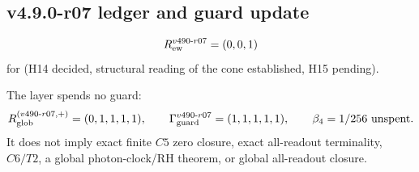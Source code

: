 \subsection*{v4.9.0-r07 ledger and guard update}
\label{subsec:v490-r07-ledger-guard}

\[
R_{\rm ew}^{v490\text{-}r07}=(0,0,1)
\]
for (H14 decided, structural reading of the cone established, H15 pending).

The layer spends no guard:
\[
R_{\rm glob}^{(v490\text{-}r07,+)}=(0,1,1,1,1),
\qquad
\Gamma_{\rm guard}^{v490\text{-}r07}=(1,1,1,1,1),
\qquad
\beta_4=1/256\ \text{unspent}.
\]
It does not imply exact finite \(C5\) zero closure, exact all-readout terminality,
\(C6/T2\), a global photon-clock/RH theorem, or global all-readout closure.

